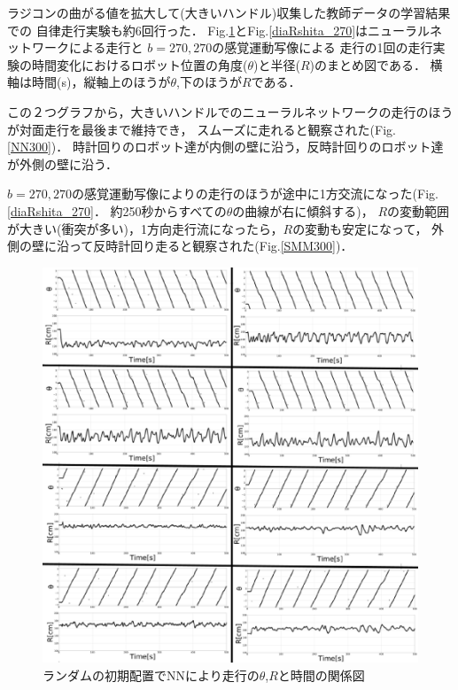 
ラジコンの曲がる値を拡大して(大きいハンドル)収集した教師データの学習結果での
自律走行実験も約6回行った．
Fig.\ref{diaRshita}とFig.\ref{diaRshita_270}はニューラルネットワークによる走行と
$b=270,270$の感覚運動写像による
走行の1回の走行実験の時間変化におけるロボット位置の角度($\theta$)と半径($R$)のまとめ図である．
横軸は時間(s)，縦軸上のほうが$\theta$,下のほうが$R$である．

この２つグラフから，大きいハンドルでのニューラルネットワークの走行のほうが対面走行を最後まで維持でき，
スムーズに走れると観察された(Fig.\ref{NN300})．
時計回りのロボット達が内側の壁に沿う，反時計回りのロボット達が外側の壁に沿う．

$b=270,270$の感覚運動写像によりの走行のほうが途中に1方交流になった(Fig.\ref{diaRshita_270}．
約250秒からすべての$\theta$の曲線が右に傾斜する)，
$R$の変動範囲が大きい(衝突が多い)，1方向走行流になったら，$R$の変動も安定になって，
外側の壁に沿って反時計回り走ると観察された(Fig.\ref{SMM300})．


\vspace{-1mm}
\begin{figure}[!ht]
    \centering
    \includegraphics[width=1.0\linewidth]{nn_shita_R_rand.eps}
    \caption{ランダムの初期配置でNNにより走行の$\theta$,$R$と時間の関係図}
    \label{diaRshita}
\end{figure}

